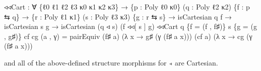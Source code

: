 \documentclass[
  11pt,
  oneside,
  article]{memoir}
\newenvironment{Shaded}{}{}
\newcommand{\NormalTok}[1]{#1}
\newcommand{\OtherTok}[1]{\textcolor[rgb]{0.00,0.44,0.13}{#1}}
\theoremstyle{definition}
\theoremstyle{plain}
\newcommand{\0}{\textsf{0}}
\newcommand{\1}{\tn{\textsf{1}}}
\begin{document}
\begin{Shaded}
\begin{Highlighting}[]
\NormalTok{◃◃Cart }\OtherTok{:} \OtherTok{∀} \OtherTok{\{}\NormalTok{ℓ0 ℓ1 ℓ2 ℓ3 κ0 κ1 κ2 κ3}\OtherTok{\}}
         \OtherTok{→} \OtherTok{\{}\NormalTok{p }\OtherTok{:}\NormalTok{ Poly ℓ0 κ0}\OtherTok{\}} \OtherTok{(}\NormalTok{q }\OtherTok{:}\NormalTok{ Poly ℓ2 κ2}\OtherTok{)} \OtherTok{\{}\NormalTok{f }\OtherTok{:}\NormalTok{ p ⇆ q}\OtherTok{\}}
         \OtherTok{→} \OtherTok{\{}\NormalTok{r }\OtherTok{:}\NormalTok{ Poly ℓ1 κ1}\OtherTok{\}} \OtherTok{(}\NormalTok{s }\OtherTok{:}\NormalTok{ Poly ℓ3 κ3}\OtherTok{)} \OtherTok{\{}\NormalTok{g }\OtherTok{:}\NormalTok{ r ⇆ s}\OtherTok{\}}
         \OtherTok{→}\NormalTok{ isCartesian q f }\OtherTok{→}\NormalTok{ isCartesian s g}
         \OtherTok{→}\NormalTok{ isCartesian }\OtherTok{(}\NormalTok{q ◃ s}\OtherTok{)} \OtherTok{(}\NormalTok{f ◃◃[ s ] g}\OtherTok{)}
\NormalTok{◃◃Cart q }\OtherTok{\{}\NormalTok{f }\OtherTok{=} \OtherTok{(}\NormalTok{f , f♯}\OtherTok{)\}}\NormalTok{ s }\OtherTok{\{}\NormalTok{g }\OtherTok{=} \OtherTok{(}\NormalTok{g , g♯}\OtherTok{)\}}\NormalTok{ cf cg }\OtherTok{(}\NormalTok{a , γ}\OtherTok{)} \OtherTok{=} 
\NormalTok{    pairEquiv }\OtherTok{(}\NormalTok{f♯ a}\OtherTok{)} \OtherTok{(λ}\NormalTok{ x }\OtherTok{→}\NormalTok{ g♯ }\OtherTok{(}\NormalTok{γ }\OtherTok{(}\NormalTok{f♯ a x}\OtherTok{)))} 
              \OtherTok{(}\NormalTok{cf a}\OtherTok{)} \OtherTok{(λ}\NormalTok{ x }\OtherTok{→}\NormalTok{ cg }\OtherTok{(}\NormalTok{γ }\OtherTok{(}\NormalTok{f♯ a x}\OtherTok{)))}
\end{Highlighting}
\end{Shaded}

and all of the above-defined structure morphisms for \texttt{◃} are
Cartesian.
\end{document}
